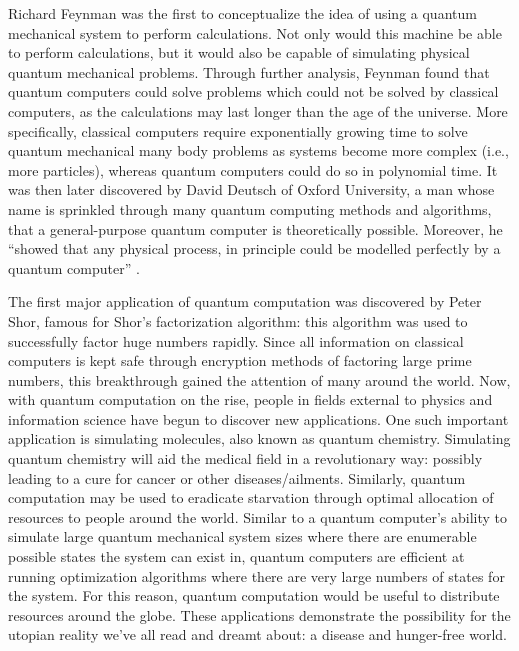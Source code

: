 

Richard Feynman was the first to conceptualize the idea of using a quantum mechanical system to perform calculations. Not only would this machine be able to perform calculations, but it would also be capable of simulating physical quantum mechanical problems. Through further analysis, Feynman found that quantum computers could solve problems which could not be solved by classical computers, as the calculations may last longer than the age of the universe. More specifically, classical computers require exponentially growing time to solve quantum mechanical many body problems as systems become more complex (i.e., more particles), whereas quantum computers could do so in polynomial time. It was then later discovered by David Deutsch of Oxford University, a man whose name is sprinkled through many quantum computing methods and algorithms, that a general-purpose quantum computer is theoretically possible. Moreover, he ``showed that any physical process, in principle could be modelled perfectly by a quantum computer'' \cite{singh_study_2005}.

The first major application of quantum computation was discovered by Peter Shor, famous for Shor's factorization algorithm: this algorithm was used to successfully factor huge numbers rapidly. Since all information on classical computers is kept safe through encryption methods of factoring large prime numbers, this breakthrough gained the attention of many around the world. Now, with quantum computation on the rise, people in fields external to physics and information science have begun to discover new applications. One such important application is simulating molecules, also known as quantum chemistry. Simulating quantum chemistry will aid the medical field in a revolutionary way: possibly leading to a cure for cancer or other diseases/ailments. Similarly, quantum computation may be used to eradicate starvation through optimal allocation of resources to people around the world. Similar to a quantum computer's ability to simulate large quantum mechanical system sizes where there are enumerable possible states the system can exist in, quantum computers are efficient at running optimization algorithms where there are very large numbers of states for the system. For this reason, quantum computation would be useful to distribute resources around the globe. These applications demonstrate the possibility for the utopian reality we've all read and dreamt about: a disease and hunger-free world.

